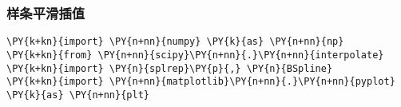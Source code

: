     \hypertarget{ux6837ux6761ux5e73ux6ed1ux63d2ux503c}{%
\subsubsection{样条平滑插值}\label{ux6837ux6761ux5e73ux6ed1ux63d2ux503c}}

    \begin{tcolorbox}[breakable, size=fbox, boxrule=1pt, pad at break*=1mm,colback=cellbackground, colframe=cellborder]
\begin{Verbatim}[commandchars=\\\{\}]
\PY{k+kn}{import} \PY{n+nn}{numpy} \PY{k}{as} \PY{n+nn}{np}
\PY{k+kn}{from} \PY{n+nn}{scipy}\PY{n+nn}{.}\PY{n+nn}{interpolate} \PY{k+kn}{import} \PY{n}{splrep}\PY{p}{,} \PY{n}{BSpline}
\PY{k+kn}{import} \PY{n+nn}{matplotlib}\PY{n+nn}{.}\PY{n+nn}{pyplot} \PY{k}{as} \PY{n+nn}{plt}
\end{Verbatim}
\end{tcolorbox}

